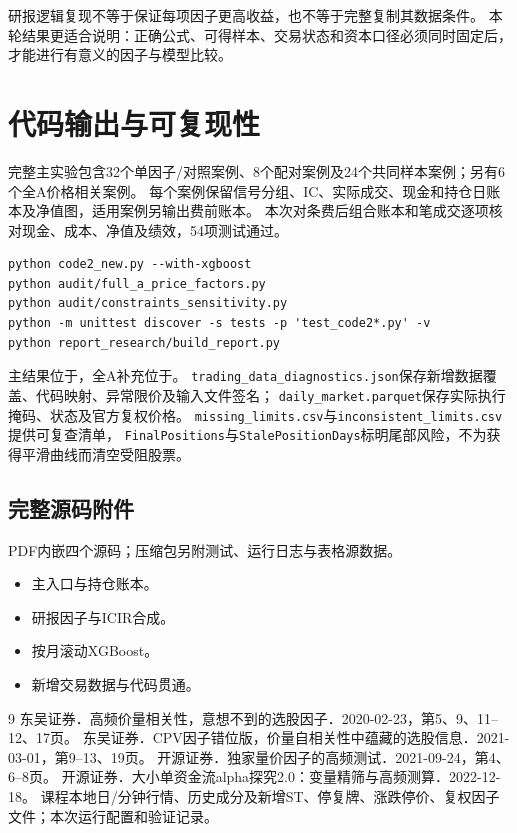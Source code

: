 \documentclass[UTF8,zihao=-4,fontset=fandol]{ctexart}
\begin{document}
研报逻辑复现不等于保证每项因子更高收益，也不等于完整复制其数据条件。
本轮结果更适合说明：正确公式、可得样本、交易状态和资本口径必须同时固定后，才能进行有意义的因子与模型比较。

\clearpage
\section{代码输出与可复现性}
完整主实验包含32个单因子/对照案例、8个配对案例及24个共同样本案例；另有6个全A价格相关案例。
每个案例保留信号分组、IC、实际成交、现金和持仓日账本及净值图，适用案例另输出费前账本。
本次对\Series 条费后组合账本和\Trades 笔成交逐项核对现金、成本、净值及绩效，54项测试通过。

\begin{Verbatim}[fontsize=\small,frame=single,breaklines=true]
python code2_new.py --with-xgboost
python audit/full_a_price_factors.py
python audit/constraints_sensitivity.py
python -m unittest discover -s tests -p 'test_code2*.py' -v
python report_research/build_report.py
\end{Verbatim}
主结果位于，全A补充位于。
\texttt{trading\_data\_diagnostics.json}保存新增数据覆盖、代码映射、异常限价及输入文件签名；
\texttt{daily\_market.parquet}保存实际执行掩码、状态及官方复权价格。
\texttt{missing\_limits.csv}与\texttt{inconsistent\_limits.csv}提供可复查清单，
\texttt{FinalPositions}与\texttt{StalePositionDays}标明尾部风险，不为获得平滑曲线而清空受阻股票。

\subsection*{完整源码附件}
PDF内嵌四个源码；压缩包另附测试、运行日志与表格源数据。
\begin{itemize}
\item {}\quad 主入口与持仓账本。
\item {}\quad 研报因子与ICIR合成。
\item {}\quad 按月滚动XGBoost。
\item {}\quad 新增交易数据与代码贯通。
\end{itemize}

\begin{thebibliography}{9}\small
{} 东吴证券．高频价量相关性，意想不到的选股因子．2020-02-23，第5、9、11--12、17页。
 东吴证券．CPV因子错位版，价量自相关性中蕴藏的选股信息．2021-03-01，第9--13、19页。
 开源证券．独家量价因子的高频测试．2021-09-24，第4、6--8页。
 开源证券．大小单资金流alpha探究2.0：变量精筛与高频测算．2022-12-18。
 课程本地日/分钟行情、历史成分及新增ST、停复牌、涨跌停价、复权因子文件；本次运行配置和验证记录。
\end{thebibliography}

\appendix

\end{document}
